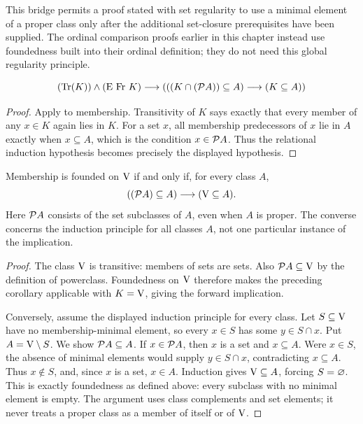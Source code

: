 This bridge permits a proof stated with set regularity to use a minimal
element of a proper class only after the additional set-closure
prerequisites have been supplied. The ordinal comparison proofs earlier
in this chapter instead use foundedness built into their ordinal
definition; they do not need this global regularity principle.
\begin{corollary}
\[
({\textrm{Tr}}(K))
\land
(\mathrm{E}\mathrm{\ Fr\ }K)
\longrightarrow
(
((K\cap(\mathcal{P} A))\subseteq A)
\longrightarrow
(K\subseteq A)
)
\]
\end{corollary}
\begin{proof}
Apply  to membership. Transitivity of $K$ says exactly
that every member of any $x\in K$ again lies in $K$. For a set $x$,
all membership predecessors of $x$ lie in $A$ exactly when $x\subseteq A$,
which is the condition $x\in\mathcal{P} A$. Thus the relational induction
hypothesis becomes precisely the displayed hypothesis.
\end{proof}
\begin{corollary}
Membership is founded on $\mathrm{V}$ if and only if, for every class $A$,
\[
((\mathcal{P} A)\subseteq A)
\longrightarrow
(\mathrm{V}\subseteq A).
\]
Here $\mathcal{P} A$ consists of the set subclasses of $A$, even when $A$
is proper. The converse concerns the induction principle for all classes
$A$, not one particular instance of the implication.
\end{corollary}
\begin{proof}
The class $\mathrm{V}$ is transitive: members of sets are sets. Also
$\mathcal{P} A\subseteq\mathrm{V}$ by the definition of powerclass. Foundedness
on $\mathrm{V}$ therefore makes the preceding corollary applicable with
$K=\mathrm{V}$, giving the forward implication.

Conversely, assume the displayed induction principle for every class.
Let $S\subseteq\mathrm{V}$ have no membership-minimal element, so every
$x\in S$ has some $y\in S\cap x$. Put $A=\mathrm{V}\setminus S$.
We show $\mathcal{P} A\subseteq A$. If $x\in\mathcal{P} A$, then $x$ is a
set and $x\subseteq A$. Were $x\in S$, the absence of minimal elements
would supply $y\in S\cap x$, contradicting $x\subseteq A$.
Thus $x\notin S$, and, since $x$ is a set, $x\in A$.
Induction gives $\mathrm{V}\subseteq A$, forcing $S=\varnothing$. This is
exactly foundedness as defined above: every subclass with no minimal
element is empty. The argument uses class complements and set elements;
it never treats a proper class as a member of itself or of $\mathrm{V}$.
\end{proof}
